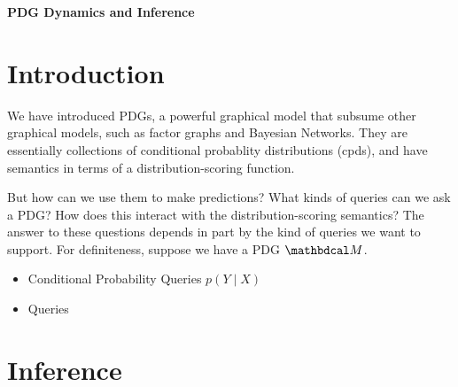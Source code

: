 \documentclass{article}
\theoremstyle{plain}
\theoremstyle{definition}
\begin{document}
\begin{center}
	{\bfseries\Large PDG Dynamics and Inference}
\end{center}	
	
\section{Introduction}

We have introduced PDGs, a powerful graphical model that subsume other graphical
models, such as factor graphs and Bayesian Networks. They are essentially 
collections of conditional probablity distributions (cpds), and have semantics in
terms of a distribution-scoring function.

But how can we use them to make predictions? What kinds of queries can we ask a
PDG? How does this interact with the distribution-scoring semantics? The answer
to these questions depends in part by the kind of queries we want to support.
For definiteness, suppose we have a PDG $\dg M$.

\begin{itemize}
  	\item Conditional Probability Queries $p(Y \mid X)$
	\item Queries
\end{itemize}




\section{Inference}
\end{document}
